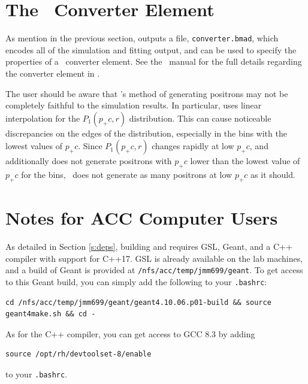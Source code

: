 \documentclass[12pt]{article}
\begin{document}
\section{The \bmad \, Converter Element}

As mention in the previous section, \exef outputs a file, \texttt{converter.bmad}, which encodes all of the simulation and fitting output, and can be used to specify the properties of a \bmad \, converter element.
See the \bmad \, manual for the full details regarding the converter element in \bmad.

The user should be aware that \bmad's method of generating positrons may not be completely faithful to the simulation results.
In particular, \bmad uses linear interpolation for the $P_1(p_+c, r)$ distribution.
This can cause noticeable discrepancies on the edges of the distribution, especially in the bins with the lowest values of $p_+ c$.
Since $P_1(p_+c, r)$ changes rapidly at low $p_+ c$, and \bmad \, additionally does not generate positrons with $p_+ c$ lower than the lowest value of $p_+ c$ for the bins, \bmad \, does not generate as many positrons at low $p_+ c$ as it should.


\appendix

\section{Notes for ACC Computer Users}

As detailed in Section \ref{s:deps}, building \exes and \exef requires GSL, Geant, and a C++ compiler with support for C++17.
GSL is already available on the lab machines, and a build of Geant is provided at \texttt{/nfs/acc/temp/jmm699/geant}.
To get access to this Geant build, you can simply add the following to your \texttt{.bashrc}:
\begin{verbatim}
cd /nfs/acc/temp/jmm699/geant/geant4.10.06.p01-build && source geant4make.sh && cd -
\end{verbatim}
As for the C++ compiler, you can get access to GCC 8.3 by adding
\begin{verbatim}
source /opt/rh/devtoolset-8/enable
\end{verbatim}
to your \texttt{.bashrc}.








\printbibliography
\end{document}
